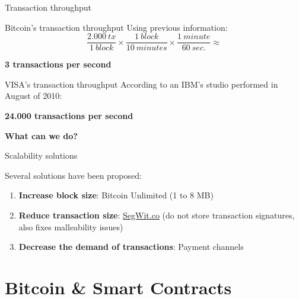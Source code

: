 \documentclass{beamer}
\begin{document}
\begin{frame}{Transaction throughput}
 \begin{block}{Bitcoin's transaction throughput}
  Using previous information:
  \begin{displaymath}
   \frac{2.000\ tx}{1\ block} \times
   \frac{1\ block}{10\ minutes} \times
   \frac{1\ minute}{60\ sec.} \approx
  \end{displaymath}
  \begin{center}
   \textbf{3 transactions per second}
  \end{center}
 \end{block}
 \begin{block}{VISA's transaction throughput}
  According to an IBM's studio performed in August of 2010:
  \begin{center}
   \textbf{24.000 transactions per second}
  \end{center}
 \end{block}
\end{frame}
\begin{frame}
 \begin{center}
  \textbf{What can we do?}
 \end{center}
\end{frame}
\begin{frame}{Scalability solutions}
 \begin{center}
  Several solutions have been proposed:\\
  \begin{enumerate}
   \item \textbf{Increase block size}: Bitcoin Unlimited (1 to 8 MB)
   \item \textbf{Reduce transaction size}: \url{SegWit.co} (do not store transaction signatures, also fixes malleability issues)
   \item \textbf{Decrease the demand of transactions}: Payment channels
  \end{enumerate}
 \end{center}
\end{frame}
\section{Bitcoin \& Smart Contracts}
\end{document}
